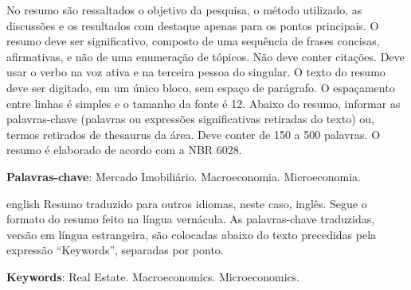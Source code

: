 \documentclass[
	12pt,				%
	oneside,			%
	a4paper,			%
	chapter=TITLE,		%
	section=TITLE,		%
	english,			%
	brazil				%
	]{abntex2}
\begin{document}
\setlength{\absparsep}{18pt} %
\begin{resumo}
	\SingleSpacing
  No resumo são ressaltados o objetivo da pesquisa, o método utilizado, as discussões e os resultados com destaque apenas para os pontos principais. O resumo deve ser significativo, composto de uma sequência de frases concisas, afirmativas, e não de uma enumeração de tópicos. Não deve conter citações. Deve usar o verbo na voz ativa e na terceira pessoa do singular. O texto do resumo deve ser digitado, em um único bloco, sem espaço de parágrafo. O espaçamento entre linhas é simples e o tamanho da fonte é 12. Abaixo do resumo, informar as palavras-chave (palavras ou expressões significativas retiradas do texto) ou, termos retirados de thesaurus da área. Deve conter de 150 a 500 palavras. O resumo é elaborado de acordo com a NBR 6028. 
  
  \textbf{Palavras-chave}: 
    Mercado Imobiliário.
    Macroeconomia.
    Microeconomia.
  \end{resumo}
\begin{resumo}[Abstract]
	\SingleSpacing
	\begin{otherlanguage*}{english}
		Resumo traduzido para outros idiomas, neste caso, inglês. Segue o formato do resumo feito na língua vernácula. As palavras-chave traduzidas, versão em língua estrangeira, são colocadas abaixo do texto precedidas pela expressão ``Keywords'', separadas por ponto.
		
		\textbf{Keywords}:
	      Real Estate.
        Macroeconomics.
        Microeconomics.
    	\end{otherlanguage*}
\end{resumo}
% 
%
%  
\end{document}
